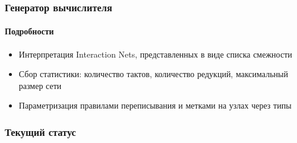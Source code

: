 \documentclass[aspectratio=169]{beamer}
\begin{document}
\begin{frame}
    \frametitle{Генератор вычислителя}
    \framesubtitle{Подробности}

    \begin{itemize}
        \item Интерпретация Interaction Nets, представленных в виде списка смежности
        \item Сбор статистики: количество тактов, количество редукций, максимальный размер сети
        \item Параметризация правилами переписывания и метками на узлах через типы
    \end{itemize}
\end{frame}

\begin{frame}
    \frametitle{Текущий статус}


\end{frame}
\end{document}
